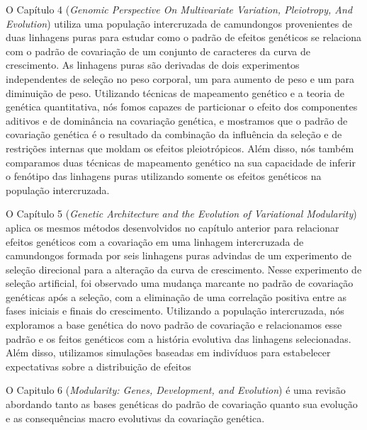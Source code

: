 \begin{refsection}
O Capítulo 4 (\textit{Genomic Perspective On Multivariate Variation,
Pleiotropy, And Evolution}) utiliza uma população intercruzada de camundongos
provenientes de duas linhagens puras para estudar como o padrão de efeitos
genéticos se relaciona com o padrão de covariação de um conjunto de caracteres
da curva de crescimento. As linhagens puras são derivadas de dois experimentos
independentes de seleção no peso corporal, um para aumento de peso e um para
diminuição de peso. Utilizando técnicas de mapeamento genético e a teoria de
genética quantitativa, nós fomos capazes de particionar o efeito dos
componentes aditivos e de dominância na covariação genética, e mostramos que o
padrão de covariação genética é o resultado da combinação da influência da
seleção e de restrições internas que moldam os efeitos pleiotrópicos. Além
disso, nós também comparamos duas técnicas de mapeamento genético na sua
capacidade de inferir o fenótipo das linhagens puras utilizando somente os
efeitos genéticos na população intercruzada. 

O Capítulo 5 (\textit{Genetic Architecture and the Evolution of Variational
Modularity}) aplica os mesmos métodos desenvolvidos no capítulo anterior para
relacionar efeitos genéticos com a covariação em uma linhagem intercruzada de
camundongos formada por seis linhagens puras advindas de um experimento de
seleção direcional para a alteração da curva de crescimento. Nesse experimento
de seleção artificial, foi observado uma mudança marcante no padrão de
covariação genéticas após a seleção, com a eliminação de uma correlação
positiva entre as fases iniciais e finais do crescimento. Utilizando a
população intercruzada, nós exploramos a base genética do novo padrão de
covariação e relacionamos esse padrão e os feitos genéticos com a história
evolutiva das linhagens selecionadas. Além disso, utilizamos simulações baseadas
em indivíduos para estabelecer expectativas sobre a distribuição de efeitos

O Capitulo 6 (\textit{Modularity: Genes, Development, and Evolution}) é uma
revisão abordando tanto as bases genéticas do padrão de covariação quanto sua
evolução e as consequências macro evolutivas da covariação genética.

\printbibliography


\end{refsection}